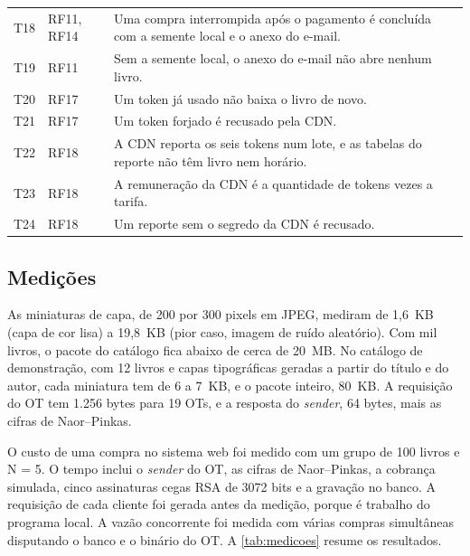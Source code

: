 \begin{table}[H]
\begin{tabularx}{\textwidth}{@{}>{\raggedright\arraybackslash}p{}
  >{\raggedright\arraybackslash}p{} >{\raggedright\arraybackslash}X@{}}
T18 & RF11, RF14 & Uma compra interrompida após o pagamento é concluída com a semente local e o anexo do e-mail. \\
T19 & RF11 & Sem a semente local, o anexo do e-mail não abre nenhum livro. \\
T20 & RF17 & Um token já usado não baixa o livro de novo. \\
T21 & RF17 & Um token forjado é recusado pela CDN. \\
T22 & RF18 & A CDN reporta os seis tokens num lote, e as tabelas do reporte não têm livro nem horário. \\
T23 & RF18 & A remuneração da CDN é a quantidade de tokens vezes a tarifa. \\
T24 & RF18 & Um reporte sem o segredo da CDN é recusado. \\
\bottomrule
\end{tabularx}
\end{table}

\subsection{Medições}

As miniaturas de capa, de 200 por 300 pixels em JPEG, mediram de 1,6~KB (capa
de cor lisa) a 19,8~KB (pior caso, imagem de ruído aleatório). Com mil livros,
o pacote do catálogo fica abaixo de cerca de 20~MB. No catálogo de
demonstração, com 12 livros e capas tipográficas geradas a partir do título e
do autor, cada miniatura tem de 6 a 7~KB, e o pacote inteiro, 80~KB. A requisição do OT tem
1.256 bytes para 19 OTs, e a resposta do \emph{sender}, 64 bytes, mais as
cifras de Naor--Pinkas.

O custo de uma compra no sistema web foi medido com um grupo de 100 livros e
N = 5. O tempo inclui o \emph{sender} do OT, as cifras de Naor--Pinkas, a
cobrança simulada, cinco assinaturas cegas RSA de 3072 bits e a gravação no
banco. A requisição de cada cliente foi gerada antes da medição, porque é
trabalho do programa local. A vazão concorrente foi medida com várias compras
simultâneas disputando o banco e o binário do OT. A
\autoref{tab:medicoes} resume os resultados.

